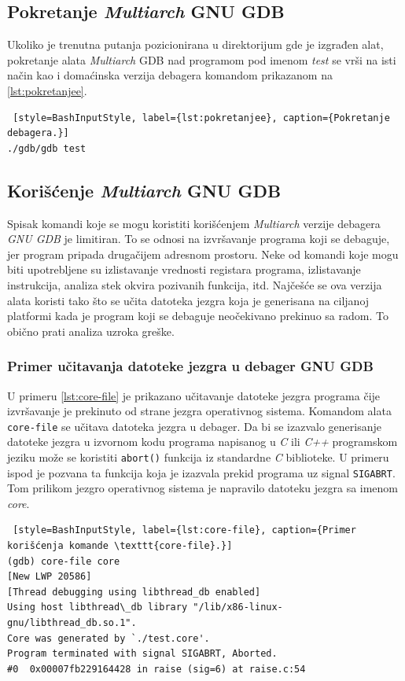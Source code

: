 \documentclass[12pt,oneside]{memoir}
\begin{document}
\subsection{Pokretanje \emph{Multiarch} GNU GDB}

Ukoliko je trenutna putanja pozicionirana u direktorijum gde je izgrađen alat, pokretanje alata \emph{Multiarch} GDB nad programom pod imenom \emph{test} se vrši na isti način kao i domaćinska verzija debagera komandom prikazanom na \ref{lst:pokretanjee}.
\begin{lstlisting} [style=BashInputStyle, label={lst:pokretanjee}, caption={Pokretanje debagera.}]
./gdb/gdb test

\end{lstlisting}

\subsection{Korišćenje \emph{Multiarch} GNU GDB}

Spisak komandi koje se mogu koristiti korišćenjem \emph{Multiarch} verzije debagera \emph{GNU GDB} je limitiran. To se odnosi na izvršavanje programa koji se debaguje, jer program pripada drugačijem adresnom prostoru. Neke od komandi koje mogu biti upotrebljene su izlistavanje vrednosti registara programa, izlistavanje instrukcija, analiza stek okvira pozivanih funkcija, itd. Najčešće se ova verzija alata koristi tako što se učita datoteka jezgra koja je generisana na ciljanoj platformi kada je program koji se debaguje neočekivano prekinuo sa radom. To obično prati analiza uzroka greške.

\subsubsection{Primer učitavanja datoteke jezgra u debager GNU GDB}

U primeru \ref{lst:core-file} je prikazano učitavanje datoteke jezgra programa čije izvršavanje je prekinuto od strane jezgra operativnog sistema. Komandom alata \texttt{core-file} se učitava datoteka jezgra u debager. Da bi se izazvalo generisanje datoteke jezgra u izvornom kodu programa napisanog u \emph{C} ili \emph{C++} programskom jeziku može se koristiti \texttt{abort()} funkcija iz standardne \emph{C} biblioteke. U primeru ispod je pozvana ta funkcija koja je izazvala prekid programa uz signal \texttt{SIGABRT}. Tom prilikom jezgro operativnog sistema je napravilo datoteku jezgra sa imenom \emph{core}.
\begin{lstlisting} [style=BashInputStyle, label={lst:core-file}, caption={Primer korišćenja komande \texttt{core-file}.}]
(gdb) core-file core
[New LWP 20586]
[Thread debugging using libthread_db enabled]
Using host libthread\_db library "/lib/x86-linux-gnu/libthread_db.so.1".
Core was generated by `./test.core'.
Program terminated with signal SIGABRT, Aborted.
#0  0x00007fb229164428 in raise (sig=6) at raise.c:54
\end{lstlisting}
\end{document}
